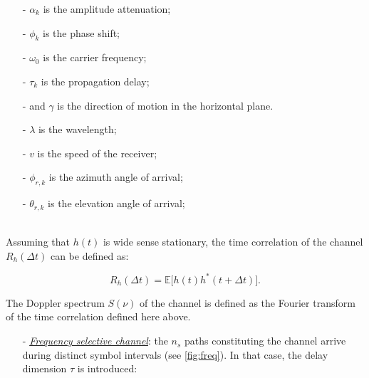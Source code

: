 \documentclass [a4paper, 11pt] {article}
\begin{document}
\begin{reminder}
\begin{enumerate}
\begin{itemize}
        \begin{minipage}[t]{0.45\textwidth}
            \begin{itemize}
            \item[-] $\alpha_k$ is the amplitude attenuation;
            \item[-] $\phi_k$ is the phase shift;
            \item[-] $\omega_0$ is the carrier frequency;
            \item[-] $\tau_k$ is the propagation delay;
            \item[-] and $\gamma$ is the direction of motion in the horizontal plane.
        \end{itemize}
        \end{minipage}
        \hfill
        \begin{minipage}[t]{0.45\textwidth}
            \begin{itemize}
            \item[-] $\lambda$ is the wavelength;
            \item[-] $v$ is the speed of the receiver;
            \item[-] $\phi_{r,k}$ is the azimuth angle of arrival;
            \item[-] $\theta_{r,k}$ is the elevation angle of arrival;
        \end{itemize}
        \end{minipage}\\

        Assuming that $h(t)$ is wide sense stationary, the time correlation of the channel $R_h(\Delta t)$ can be defined as:

                \begin{equation}
                R_h(\Delta t) = \mathbb{E}\Big[h(t)h^*(t+\Delta t)\Big].
                \end{equation}

        The Doppler spectrum $S(\nu)$ of the channel is defined as the Fourier transform of the time correlation defined here above.

        \end{itemize}
        \end{enumerate}

        \begin{itemize}

        \item[-] \underline{\textit{Frequency selective channel}}: the $n_s$ paths constituting the channel arrive during distinct symbol intervals (see \autoref{fig:freq}). In that case, the delay dimension $\tau$ is introduced:


\end{itemize}
\end{reminder}
\end{document}
